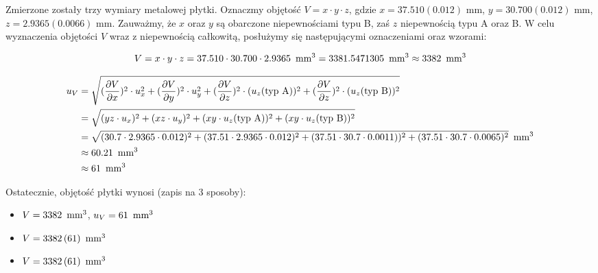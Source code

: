 \documentclass[a4paper]{article}
\begin{document}
Zmierzone zostały trzy wymiary metalowej płytki.
Oznaczmy objętość $V = x \cdot y \cdot z$, gdzie $x = 37.510 (0.012)$ mm, $y = 30.700 (0.012)$ mm, $z = 2.9365 (0.0066)$ mm.
Zauważmy, że $x$ oraz $y$ są obarczone niepewnościami typu B, zaś $z$ niepewnością typu A oraz B.
W celu wyznaczenia objętości $V$ wraz z niepewnością całkowitą, posłużymy się następującymi oznaczeniami oraz wzorami:

$$V = x \cdot y \cdot z = 37.510 \cdot 30.700 \cdot 2.9365 \enskip \text{mm}^3 = 3381.5471305 \enskip \text{mm}^3 \approx 3382 \enskip \text{mm}^3$$

\begin{align*}
u_V &= \sqrt{(\frac{\partial V}{\partial x})^2 \cdot u_x^2 + (\frac{\partial V}{\partial y})^2 \cdot u_y^2 + (\frac{\partial V}{\partial z})^2 \cdot (u_z \text{(typ A)})^2 + (\frac{\partial V}{\partial z})^2 \cdot (u_z \text{(typ B)})^2} \\
	&= \sqrt{(yz \cdot u_x)^2 + (xz \cdot u_y)^2 + (xy \cdot u_z \text{(typ A)})^2 + (xy \cdot u_z \text{(typ B)})^2} \\
	&= \sqrt{(30.7 \cdot 2.9365 \cdot 0.012)^2 + (37.51 \cdot 2.9365 \cdot 0.012)^2 + (37.51 \cdot 30.7 \cdot 0.0011))^2 + (37.51 \cdot 30.7 \cdot 0.0065)^2} \enskip \text{mm}^3\\
	&\approx 60.21 \enskip \text{mm}^3 \\
	&\approx 61 \enskip \text{mm}^3
\end{align*}

Ostatecznie, objętość płytki wynosi (zapis na 3 sposoby):

\begin{itemize}
\item $V = 3382 \enskip \text{mm}^3$, $u_V = 61 \enskip \text{mm}^3$
\item $V = 3382 \, (61) \enskip \text{mm}^3$
\item $V = 3382 \, (61) \enskip \text{mm}^3$
\end{itemize}
\end{document}
